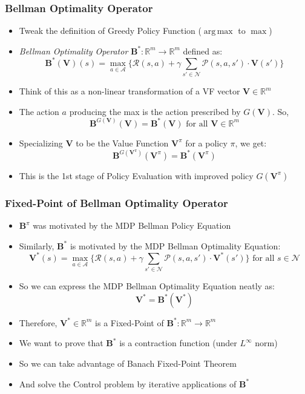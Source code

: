 \documentclass[handout]{beamer}
\DeclareMathOperator*{\argmax}{arg\,max}
\newcommand{\bvpi}{\bm{V}^{\pi}}
\newcommand{\bvs}{\bm{V}^*}
\newcommand{\bbpi}{\bm{B}^{\pi}}
\newcommand{\bbs}{\bm{B}^*}
\newcommand{\bv}{\bm{V}}
\begin{document}
\begin{frame}
\frametitle{Bellman Optimality Operator}
\pause
\begin{itemize}[<+->]
\item Tweak the definition of Greedy Policy Function ($\argmax$ to $\max$)
\item {\em Bellman Optimality Operator} $\bbs: \mathbb{R}^m \rightarrow \mathbb{R}^m$ defined as:
$$\bbs(\bv)(s) = \max_{a\in \mathcal{A}} \{\mathcal{R}(s,a) + \gamma \sum_{s' \in \mathcal{N}} \mathcal{P}(s,a,s') \cdot \bv(s')\}$$
\item Think of this as a non-linear transformation of a VF vector $\bv \in \mathbb{R}^m$
\item The action $a$ producing the max is the action prescribed by $G(\bv)$. So,
$$\bm{B}^{G(\bv)}(\bv) = \bbs(\bv) \text{ for all } \bv \in \mathbb{R}^m$$
\item Specializing $\bv$ to be the Value Function $\bvpi$ for a policy $\pi$, we get:
$$\bm{B}^{G(\bvpi)}(\bvpi) = \bbs(\bvpi)$$
\item This is the 1st stage of Policy Evaluation with improved policy $G(\bvpi)$
\end{itemize}
\end{frame}

\begin{frame}
\frametitle{Fixed-Point of Bellman Optimality Operator}
\pause
\begin{itemize}[<+->]
\item $\bbpi$ was motivated by the MDP Bellman Policy Equation
\item Similarly, $\bbs$ is motivated by the MDP Bellman Optimality Equation:
$$\bvs(s) = \max_{a \in \mathcal{A}} \{ \mathcal{R}(s,a) + \gamma \sum_{s' \in \mathcal{N}} \mathcal{P}(s,a,s') \cdot \bvs(s') \} \text{ for all } s \in \mathcal{N}$$
\item So we can express the MDP Bellman Optimality Equation neatly as:
$$\bvs = \bbs(\bvs)$$
\item Therefore, $\bvs \in \mathbb{R}^m$ is a Fixed-Point of $\bbs: \mathbb{R}^m \rightarrow \mathbb{R}^m$
\item We want to prove that $\bbs$ is a contraction function (under $L^{\infty}$ norm)
\item So we can take advantage of Banach Fixed-Point Theorem
\item And solve the Control problem by iterative applications of $\bbs$
\end{itemize}
\end{frame}
\end{document}
